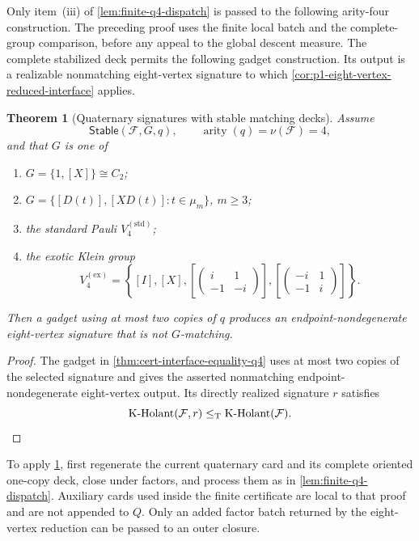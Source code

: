 \documentclass[11pt,letterpaper,onecolumn]{article}
\theoremstyle{plain}
\newtheorem{theorem}{Theorem}[section]
\theoremstyle{definition}
\theoremstyle{remark}
\newcommand{\cF}{\mathcal F}
\newcommand{\KHolant}{\operatorname{K\text{-}Holant}}
\newcommand{\KleinStd}{{V_4^{(\mathrm{std})}}}
\newcommand{\KleinEx}{{V_4^{(\mathrm{ex})}}}
\newcommand{\Stable}{\mathsf{Stable}}
\newcommand{\arity}{\operatorname{arity}}
\newcommand{\leT}{\leq_{\mathrm T}}
\begin{document}
Only item~(iii) of \cref{lem:finite-q4-dispatch} is passed to the
following arity-four construction. The preceding proof uses the finite
local batch and the complete-group comparison, before any appeal to
the global descent measure. The complete stabilized deck permits the
following gadget construction.  Its output is a realizable nonmatching eight-vertex
signature to which \cref{cor:p1-eight-vertex-reduced-interface} applies.

\begin{theorem}[Quaternary signatures with stable matching decks]
\label{thm:equality-q4-boundary}
Assume
\[
 \Stable(\cF,G,q),\qquad \arity(q)=\nu(\cF)=4,
\]
and that \(G\) is one of
\begin{enumerate}
\item \(G=\{1,[X]\}\cong C_2\);
\item \(G=\{[D(t)],[XD(t)]:t\in\mu_m\}\), \(m\ge3\);
\item the standard Pauli \(\KleinStd\);
\item the exotic Klein group
  \begin{equation*}
   \KleinEx
   =
   \left\{[I],[X],
   \left[\begin{pmatrix}i&1\\-1&-i\end{pmatrix}\right],
   \left[\begin{pmatrix}-i&1\\-1&i\end{pmatrix}\right]\right\}.
  \end{equation*}
\end{enumerate}
Then a gadget using at most two copies of \(q\) produces an
endpoint-nondegenerate eight-vertex signature that is not \(G\)-matching.
\end{theorem}

\begin{proof}
The gadget in \cref{thm:cert-interface-equality-q4} uses at most two
copies of the selected signature and gives the asserted nonmatching
endpoint-nondegenerate eight-vertex output. Its directly realized signature
\(r\) satisfies
\[
  \KHolant(\cF,r)
  \leT\KHolant(\cF).\qedhere
\]
\end{proof}

To apply \cref{thm:equality-q4-boundary}, first regenerate the current
quaternary card and its complete oriented one-copy deck, close under
factors, and process them as in \cref{lem:finite-q4-dispatch}.  Auxiliary cards used inside the finite
certificate are local to that proof and are not appended to \(Q\).  Only an added factor batch returned by the eight-vertex reduction can be passed to an
outer closure.
\end{document}
